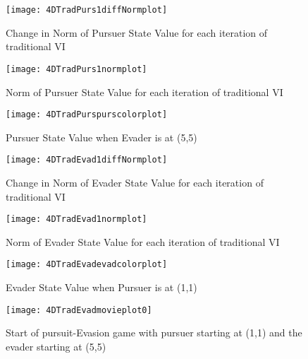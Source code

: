 \begin{figure}
\vspace{2.4in}
\centering
\texttt{[image: 4DTradPurs1diffNormplot]}
\caption{Change in Norm of Pursuer State Value for each iteration of traditional VI}
\label{4DTradPurs1diffNormplot}
\end{figure}
\clearpage
\newpage

\begin{figure}
\vspace{2.4in}
\centering
\texttt{[image: 4DTradPurs1normplot]}
\caption{Norm of Pursuer State Value for each iteration of traditional VI}
\label{4DTradPurs1normplot}
\end{figure}
\clearpage
\newpage

\begin{figure}
\vspace{2.4in}
\centering
\texttt{[image: 4DTradPurspurscolorplot]}
\caption{Pursuer State Value when Evader is at (5,5)}
\label{4DTradPurspurscolorplot}
\end{figure}
\clearpage
\newpage

\begin{figure}
\vspace{2.4in}
\centering
\texttt{[image: 4DTradEvad1diffNormplot]}
\caption{Change in Norm of Evader State Value for each iteration of traditional VI}
\label{4DTradEvad1diffNormplot}
\end{figure}
\clearpage
\newpage

\begin{figure}
\vspace{2.4in}
\centering
\texttt{[image: 4DTradEvad1normplot]}
\caption{Norm of Evader State Value for each iteration of traditional VI}
\label{4DTradEvad1normplot}
\end{figure}
\clearpage
\newpage

\begin{figure}
\vspace{2.4in}
\centering
\texttt{[image: 4DTradEvadevadcolorplot]}
\caption{Evader State Value when Pursuer is at (1,1)}
\label{4DTradEvadevadcolorplot}
\end{figure}
\clearpage
\newpage

\begin{figure}
\vspace{2.4in}
\centering
\texttt{[image: 4DTradEvadmovieplot0]}
\caption{Start of pursuit-Evasion game with pursuer starting at (1,1) and the evader starting at (5,5)}
\label{4DTradEvadmovieplot0}
\end{figure}
\clearpage
\newpage

